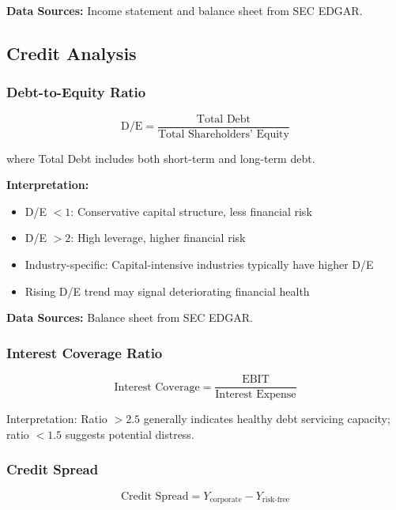 \documentclass[11pt,a4paper]{article}
\begin{document}
\textbf{Data Sources:} Income statement and balance sheet from SEC EDGAR.

\subsection{Credit Analysis}

\subsubsection{Debt-to-Equity Ratio}

\begin{equation}
\text{D/E} = \frac{\text{Total Debt}}{\text{Total Shareholders' Equity}}
\end{equation}

where Total Debt includes both short-term and long-term debt.

\textbf{Interpretation:}
\begin{itemize}
    \item D/E $< 1$: Conservative capital structure, less financial risk
    \item D/E $> 2$: High leverage, higher financial risk
    \item Industry-specific: Capital-intensive industries typically have higher D/E
    \item Rising D/E trend may signal deteriorating financial health
\end{itemize}

\textbf{Data Sources:} Balance sheet from SEC EDGAR.

\subsubsection{Interest Coverage Ratio}

\begin{equation}
\text{Interest Coverage} = \frac{\text{EBIT}}{\text{Interest Expense}}
\end{equation}

Interpretation: Ratio $> 2.5$ generally indicates healthy debt servicing capacity; ratio $< 1.5$ suggests potential distress.

\subsubsection{Credit Spread}

\begin{equation}
\text{Credit Spread} = Y_{\text{corporate}} - Y_{\text{risk-free}}
\end{equation}
\end{document}
